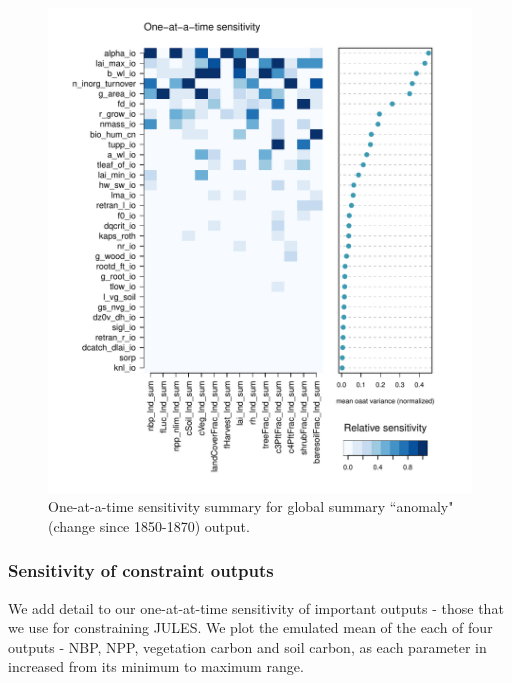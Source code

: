 \documentclass[gmd, manuscript]{copernicus}
\begin{document}
\begin{figure}[t]
\includegraphics[width=12cm]{./graphics/oat_var_sensmat_level1a_YAnom}
\caption{One-at-a-time sensitivity summary for global summary ``anomaly" (change since 1850-1870) output.}
\label{fig:oat_var_sensmat_level1a_YAnom}
\end{figure}


\subsubsection{Sensitivity of constraint outputs}

We add detail to our one-at-at-time sensitivity of important outputs - those that we use for constraining JULES. We plot the emulated mean of the each of four outputs - NBP, NPP, vegetation carbon and soil carbon, as each parameter in increased from its minimum to maximum range.
\end{document}
